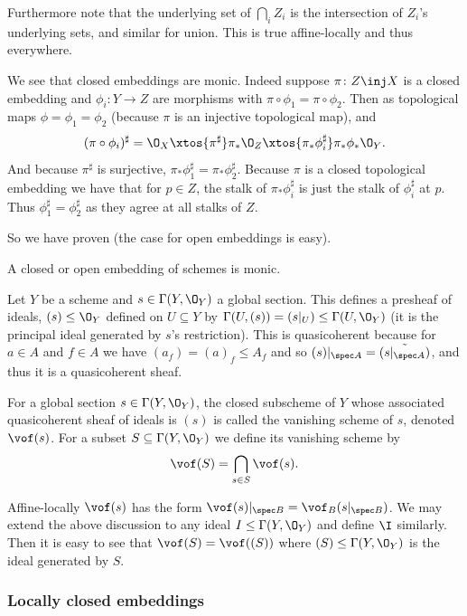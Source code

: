 Furthermore note that the underlying set of $\bigcap_iZ_i$ is the intersection of $Z_i$'s underlying sets,
and similar for union.
This is true affine-locally and thus everywhere.

We see that closed embeddings are monic.
Indeed suppose $\pi\colon Z\inj X$ is a closed embedding and $\phi_i\colon Y\to Z$ are morphisms with
$\pi\circ\phi_1=\pi\circ\phi_2$.
Then as topological maps $\phi=\phi_1=\phi_2$ (because $\pi$ is an injective topological map), and
$$ (\pi\circ\phi_i)^\sharp = \O_X \xtos{\pi^\sharp} \pi_*\O_Z \xtos{\pi_*\phi_i^\sharp} \pi_*\phi_*\O_Y . $$
And because $\pi^\sharp$ is surjective, $\pi_*\phi_1^\sharp=\pi_*\phi_2^\sharp$.
Because $\pi$ is a closed topological embedding we have that for $p\in Z$, the stalk of $\pi_*\phi_i^\sharp$
is just the stalk of $\phi_i^\sharp$ at $p$.
Thus $\phi_1^\sharp=\phi_2^\sharp$ as they agree at all stalks of $Z$.

So we have proven (the case for open embeddings is easy).

\bprop

    A closed or open embedding of schemes is monic.

\eprop

Let $Y$ be a scheme and $s\in\Gamma(Y,\O_Y)$ a global section.
This defines a presheaf of ideals, $(s)\leq\O_Y$ defined on $U\subseteq Y$ by
$\Gamma(U,(s))=(s|_U)\leq\Gamma(U,\O_Y)$ (it is the principal ideal generated by $s$'s restriction).
This is quasicoherent because for $a\in A$ and $f\in A$ we have $(a_f)=(a)_f\leq A_f$ and so
$(s)|_{\spec A}=\tilde{(s|_{\spec A})}$, and thus it is a quasicoherent sheaf.

\bdefn

    For a global section $s\in\Gamma(Y,\O_Y)$, the closed subscheme of $Y$ whose associated quasicoherent
    sheaf of ideals is $(s)$ is called the {\emphcolor vanishing scheme of $s$}, denoted $\vof(s)$.
    For a subset $S\subseteq\Gamma(Y,\O_Y)$ we define its vanishing scheme by
    $$ \vof(S) = \bigcap_{s\in S}\vof(s) . $$

\edefn

Affine-locally $\vof(s)$ has the form $\vof(s)|_{\spec B}=\vof_B(s|_{\spec B})$.
We may extend the above discussion to any ideal $I\leq\Gamma(Y,\O_Y)$ and define $\I$ similarly.
Then it is easy to see that $\vof(S)=\vof((S))$ where $(S)\leq\Gamma(Y,\O_Y)$ is the ideal generated by $S$.

\subsubsection{Locally closed embeddings}

